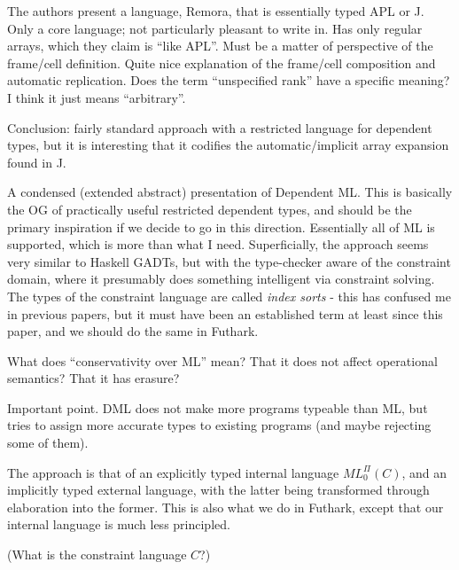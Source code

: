 \documentclass[a4paper, oneside, final]{memoir}
\begin{document}
\begin{quote}
\end{quote}

The authors present a language, Remora, that is essentially typed APL
or J.  Only a core language; not particularly pleasant to write in.
Has only regular arrays, which they claim is ``like APL''.  Must be a
matter of perspective of the frame/cell definition.  Quite nice
explanation of the frame/cell composition and automatic
replication. Does the term ``unspecified rank'' have a specific
meaning?  I think it just means ``arbitrary''.

Conclusion: fairly standard approach with a restricted language for
dependent types, but it is interesting that it codifies the
automatic/implicit array expansion found in J.

\begin{quote}
\end{quote}

A condensed (extended abstract) presentation of Dependent ML.  This is
basically the OG of practically useful restricted dependent types, and
should be the primary inspiration if we decide to go in this
direction.  Essentially all of ML is supported, which is more than
what I need.  Superficially, the approach seems very similar to
Haskell GADTs, but with the type-checker aware of the constraint
domain, where it presumably does something intelligent via constraint
solving.  The types of the constraint language are called
\textit{index sorts} - this has confused me in previous papers, but it
must have been an established term at least since this paper, and we
should do the same in Futhark.

What does ``conservativity over ML'' mean?  That it does not affect
operational semantics?  That it has erasure?

Important point. DML does not make more programs typeable than ML, but
tries to assign more accurate types to existing programs (and maybe
rejecting some of them).

The approach is that of an explicitly typed internal language
$ML_{0}^{\Pi}(C)$, and an implicitly typed external language, with the
latter being transformed through elaboration into the former.  This is
also what we do in Futhark, except that our internal language is much
less principled.

(What is the constraint language $C$?)
\end{document}
